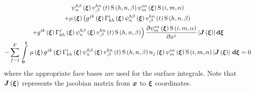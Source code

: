 \begin{multline}
  \idxgbfn{h}{n}{\beta}{\vectr{\xi}}\fnof{\idxnodedof{v}{h}{n}{\beta}}{t}\idxgsf{h}{n}{\beta}
  \idxgbfn{i}{m}{\alpha}{\vectr{\xi}}\idxgsf{i}{m}{\alpha}\\
  +\fnof{\mu}{\vectr{\xi}}\left(\fnof{g^{jk}}{\vectr{\xi}}\fnof{\christoffel{i}{k}{h}}{\vectr{\xi}}
    \idxgbfn{h}{n}{\beta}{\vectr{\xi}}
    \fnof{\idxnodedof{v}{h}{n}{\beta}}{t}\idxgsf{h}{n}{\beta}\right.\\
    \left.+\fnof{g^{ik}}{\vectr{\xi}}\fnof{\christoffel{j}{k}{h}}{\vectr{\xi}}\idxgbfn{h}{n}{\beta}{\vectr{\xi}}
    \fnof{\idxnodedof{v}{h}{n}{\beta}}{t}\idxgsf{h}{n}{\beta}\right)
    \delby{\idxgbfn{i}{m}{\alpha}{\vectr{\xi}}\idxgsf{i}{m}{\alpha}}{x^{j}}
    \abs{\fnof{\matr{J}}{\vectr{\xi}}}\exteriorderiv{\vectr{\xi}}\\
  -\gsum{f=1}{F}{\gint{\vectr{0}}{\vectr{1}}{\fnof{\mu}{\vectr{\xi}}
      \fnof{g^{jk}}{\vectr{\xi}}\fnof{\christoffel{i}{k}{h}}{\vectr{\xi}}\idxgbfn{h}{n}{\beta}{\vectr{\xi}}
      \fnof{\idxnodedof{v}{h}{n}{\beta}}{t}\idxgsf{h}{n}{\beta}\fnof{n_{j}}{\vectr{\xi}}
      \idxgbfn{i}{m}{\alpha}{\vectr{\xi}}\idxgsf{i}{m}{\alpha}\abs{\fnof{\matr{J}}{\vectr{\xi}}}}{\vectr{\xi}}}
  =0
  \label{eqn:NSEFEM3}
\end{multline}
where the appropriate face bases are used for the surface integrals. Note that
$\fnof{\matr{J}}{\vectr{\xi}}$ represents the jacobian matrix from $\boldsymbol{x}$
to $\boldsymbol{\xi}$ coordinates.

